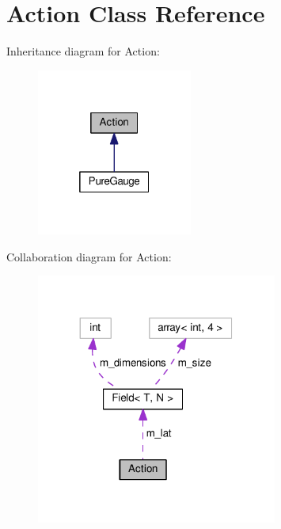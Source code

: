 \hypertarget{classAction}{}\section{Action Class Reference}
\label{classAction}


Inheritance diagram for Action\+:\nopagebreak
\begin{figure}[H]
\begin{center}
\leavevmode
\includegraphics[width=145pt]{classAction__inherit__graph}
\end{center}
\end{figure}


Collaboration diagram for Action\+:\nopagebreak
\begin{figure}[H]
\begin{center}
\leavevmode
\includegraphics[width=224pt]{classAction__coll__graph}
\end{center}
\end{figure}
